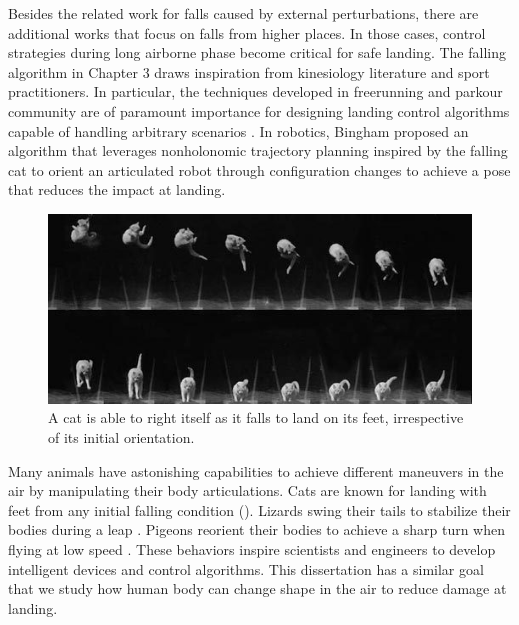 Besides the related work for falls caused by external perturbations,
there are additional works that focus on falls from higher places.
In those cases, control strategies during long airborne phase
become critical for safe landing.
The falling algorithm in Chapter 3 draws inspiration from
kinesiology literature and sport practitioners. In particular, the
techniques developed in freerunning and parkour community are of
paramount importance for designing landing control algorithms capable
of handling arbitrary scenarios
\cite{Edwardes:2009:TPF,HLJ:2011:URL}. 
In robotics, Bingham \etal \cite{Bingham:2014:OMA} proposed an algorithm 
that leverages nonholonomic trajectory planning inspired by the
falling cat to orient an articulated robot through configuration
changes to achieve a pose that reduces the impact at landing.

\begin{figure}[htbp]
\center
  \includegraphics[width=\linewidth]{images/related_cat.jpg}
  \caption{A cat is able to right itself as it falls to land on 
  its feet, irrespective of its initial orientation.}
 \label{fig:related_cat}
\end{figure}

Many animals have astonishing capabilities to achieve different
maneuvers in the air by manipulating their body articulations.  Cats
are known for landing with feet from any initial falling condition
\cite{Kane:1969:DEF,Montgomery:1993:GTF,Cat:2015:URL}
(). Lizards swing their tails to
stabilize their bodies during a leap \cite{Libby:2012:TAP}. Pigeons
reorient their bodies to achieve a sharp turn when flying at low speed
\cite{Ros:2011:PSL}. These behaviors inspire scientists and engineers
to develop intelligent devices and control algorithms. This dissertation has a
similar goal that we study how human body can change shape in the
air to reduce damage at landing.

